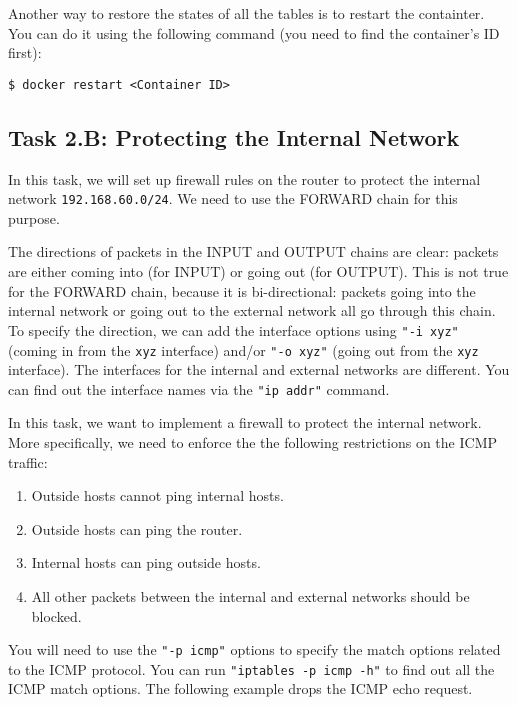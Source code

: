 Another way to restore the states of all the tables is to restart the 
containter. You can do it using the following command (you need 
to find the container's ID first):

\begin{lstlisting}
$ docker restart <Container ID>
\end{lstlisting}
 


\subsection{Task 2.B: Protecting the Internal Network} 

In this task, we will set up firewall rules on the router to protect the 
internal network \texttt{192.168.60.0/24}. We need to use the 
FORWARD chain for this purpose. 

The directions of packets in the INPUT and OUTPUT chains are clear:
packets are either coming into (for INPUT) or going out (for OUTPUT). 
This is not true for the FORWARD chain, because it is 
bi-directional: packets going into
the internal network or going out to the external network
all go through this chain. To specify the direction,
we can add the interface options using \texttt{"-i xyz"} (coming in from 
the \texttt{xyz} interface) and/or \texttt{"-o xyz"} (going out 
from the \texttt{xyz} interface). The interfaces 
for the internal and external networks are different.
You can find out the interface names via the 
\texttt{"ip addr"} command.


In this task, we want to implement a firewall to protect the 
internal network. More specifically, we need to enforce the 
the following restrictions on the ICMP traffic: 

\begin{enumerate}[noitemsep]
  \item Outside hosts cannot ping internal hosts. 
  \item Outside hosts can ping the router.
  \item Internal hosts can ping outside hosts. 
  \item All other packets between the internal and external networks should be blocked.
\end{enumerate}

You will need to use the \texttt{"-p icmp"} options to specify the match
options related to the ICMP protocol. You can run 
\texttt{"iptables -p icmp -h"} to find out all the ICMP match
options. The following example drops the ICMP echo request.


